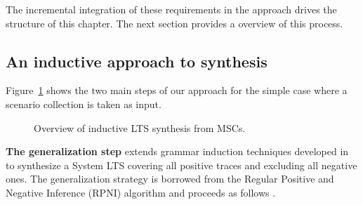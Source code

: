 The incremental integration of these requirements in the approach drives the structure of this chapter. The next section provides a overview of this process.


\subsection{An inductive approach to synthesis\label{subsection:inductive-synthesis-approach}}

Figure~\ref{image:inductive-synthesis-overview} shows the two main steps of our approach for the simple case where a scenario collection is taken as input. 

\begin{figure}[H]\centering
  \caption{Overview of inductive LTS synthesis from MSCs.\label{image:inductive-synthesis-overview}}
\end{figure}

\noindent \textbf{The generalization step} extends grammar induction techniques developed in \cite{Oncina:1992} to synthesize a System LTS covering all positive traces and excluding all negative ones. The generalization strategy is borrowed from the Regular Positive and Negative Inference (RPNI) algorithm and proceeds as follows \cite{Oncina:1992}.

